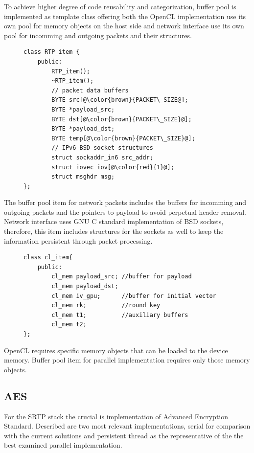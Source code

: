 To achieve higher degree of code reusability and categorization, buffer pool
is implemented as template class offering both the OpenCL implementation
use its own pool for memory objects on the host side and network interface
use its own pool for incomming and outgoing packets and their structures.

\begin{figure}[H]
\begin{lstlisting}
class RTP_item {
    public:
        RTP_item();
        ~RTP_item();
        // packet data buffers
        BYTE src[@\color{brown}{PACKET\_SIZE@];
        BYTE *payload_src;
        BYTE dst[@\color{brown}{PACKET\_SIZE}@];
        BYTE *payload_dst;
        BYTE temp[@\color{brown}{PACKET\_SIZE}@];
        // IPv6 BSD socket structures
        struct sockaddr_in6 src_addr;
        struct iovec iov[@\color{red}{1}@];
        struct msghdr msg;
};
\end{lstlisting}
\end{figure}

The buffer pool item for network packets includes the buffers for incomming and 
outgoing packets and the pointers to payload to avoid perpetual header removal.
Network interface uses GNU C standard implementation of BSD sockets, therefore,
this item includes structures for the sockets as well to keep the information
persistent through packet processing.

\begin{figure}[H]
\begin{lstlisting}
class cl_item{
    public:
        cl_mem payload_src; //buffer for payload
        cl_mem payload_dst;
        cl_mem iv_gpu;      //buffer for initial vector
        cl_mem rk;          //round key
        cl_mem t1;          //auxiliary buffers
        cl_mem t2;
};
\end{lstlisting}
\end{figure}

OpenCL requires specific memory objects that can be loaded to the device memory.
Buffer pool item for parallel implementation requires only those memory objects.


\subsection{AES}
For the SRTP stack the crucial is implementation of Advanced Encryption Standard.
Described are two most relevant implementations, serial for comparison with
the current solutions and persistent thread as the representative of the the
best examined parallel implementation.

